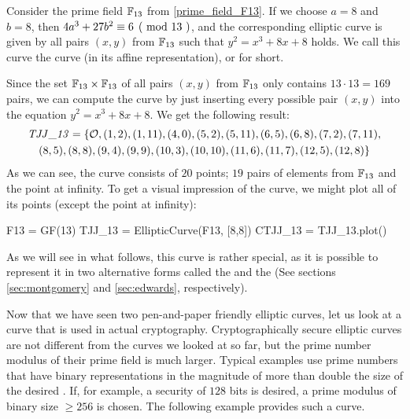 \begin{example}\label{TJJ13} Consider the prime field $\mathbb{F}_{13}$ from \exercisename{} \ref{prime_field_F13}. If we choose $a=8$ and $b=8$, then $\kongru{4a^3+ 27b^2}{6}{13}$, and the corresponding elliptic curve is given by all pairs $(x,y)$ from $\mathbb{F}_{13}$ such that $y^2=x^3+8x+8$ holds. We call this curve the  curve (in its affine  representation), or \TJJ{} for short.

Since the set $\mathbb{F}_{13}\times \mathbb{F}_{13}$ of all pairs $(x,y)$ from $\mathbb{F}_{13}$  only contains  $13\cdot 13=169$ pairs, we can compute the curve by just inserting every possible pair $(x,y)$ into the  equation $y^2 = x^3 +8x +8$.  We get the following result:
\begin{multline}\label{eq:TJJ13-weierstrass}
\mathit{TJJ\_13} = \{\mathcal{O}, (1, 2), (1, 11), (4, 0), (5, 2), (5, 11), (6, 5), (6, 8), (7,2), (7, 11), \\ (8, 5), (8, 8), (9, 4), (9, 9), (10, 3), (10,10), (11, 6), (11, 7), (12, 5), (12, 8)\}
\end{multline}
As we can see, the curve consists of $20$ points; $19$ pairs of elements from $\mathbb{F}_{13}$ and the point at infinity. To get a visual impression of the \TJJ{} curve, we might plot all of its points (except the point at infinity): 
\begin{sagesilent}
F13 = GF(13)
TJJ_13 = EllipticCurve(F13, [8,8])
CTJJ_13 = TJJ_13.plot()
\end{sagesilent}
\begin{center} 
\end{center}
As we will see in what follows, this curve is rather special, as it is possible to represent it in two alternative forms called the  and the  (See sections \ref{sec:montgomery} and \ref{sec:edwards}, respectively).
\end{example}
Now that we have seen two pen-and-paper friendly elliptic curves, let us look at a curve that is used in actual cryptography. Cryptographically secure elliptic curves are not  different from the curves we looked at so far, but the prime number modulus of their prime field is much larger. Typical examples use prime numbers that have binary representations in the magnitude of more than double the size of the desired . If, for example, a security of $128$ bits is desired, a prime modulus of binary size $\geq 256$ is chosen. The following example provides such a curve. 

